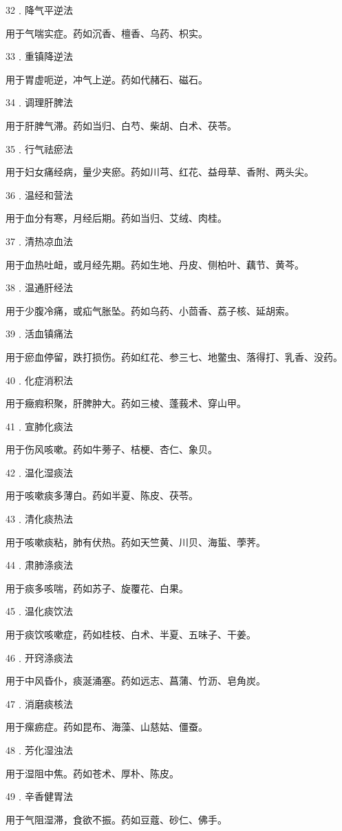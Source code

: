 \documentclass[12pt,UTF8]{ctexbook}
\begin{document}
32﹒降气平逆法

用于气喘实症。药如沉香、檀香、乌药、枳实。

33﹒重镇降逆法

用于胃虚呃逆，冲气上逆。药如代赭石、磁石。

34﹒调理肝脾法

用于肝脾气滞。药如当归、白芍、柴胡、白术、茯苓。

35﹒行气祛瘀法

用于妇女痛经病，量少夹瘀。药如川芎、红花、益母草、香附、两头尖。

36﹒温经和营法

用于血分有寒，月经后期。药如当归、艾绒、肉桂。

37﹒清热凉血法

用于血热吐衄，或月经先期。药如生地、丹皮、侧柏叶、藕节、黄芩。

38﹒温通肝经法

用于少腹冷痛，或疝气胀坠。药如乌药、小茴香、荔子核、延胡索。

39﹒活血镇痛法

用于瘀血停留，跌打损伤。药如红花、参三七、地鳖虫、落得打、乳香、没药。

40﹒化症消积法

用于癥瘕积聚，肝脾肿大。药如三棱、蓬莪术、穿山甲。

41﹒宣肺化痰法

用于伤风咳嗽。药如牛蒡子、桔梗、杏仁、象贝。

42﹒温化湿痰法

用于咳嗽痰多薄白。药如半夏、陈皮、茯苓。

43﹒清化痰热法

用于咳嗽痰粘，肺有伏热。药如天竺黄、川贝、海蜇、荸荠。

44﹒肃肺涤痰法

用于痰多咳喘，药如苏子、旋覆花、白果。

45﹒温化痰饮法

用于痰饮咳嗽症，药如桂枝、白术、半夏、五味子、干姜。

46﹒开窍涤痰法

用于中风昏仆，痰涎涌塞。药如远志、菖蒲、竹沥、皂角炭。

47﹒消磨痰核法

用于瘰疬症。药如昆布、海藻、山慈姑、僵蚕。

48﹒芳化湿浊法

用于湿阻中焦。药如苍术、厚朴、陈皮。

49﹒辛香健胃法

用于气阻湿滞，食欲不振。药如豆蔻、砂仁、佛手。
\end{document}
